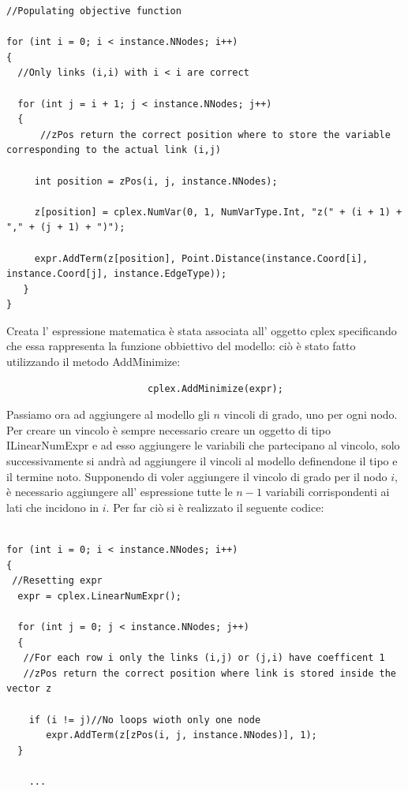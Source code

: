 \documentclass[11pt]{article}
\begin{document}
\begin{lstlisting}
//Populating objective function

for (int i = 0; i < instance.NNodes; i++)
{
  //Only links (i,i) with i < i are correct
  
  for (int j = i + 1; j < instance.NNodes; j++)
  {
      //zPos return the correct position where to store the variable corresponding to the actual link (i,j)
           
     int position = zPos(i, j, instance.NNodes);
           
     z[position] = cplex.NumVar(0, 1, NumVarType.Int, "z(" + (i + 1) + "," + (j + 1) + ")");
         
     expr.AddTerm(z[position], Point.Distance(instance.Coord[i], instance.Coord[j], instance.EdgeType));      
   }
}
\end{lstlisting}
Creata l' espressione matematica \`e stata associata all' oggetto cplex specificando che essa rappresenta la funzione obbiettivo del modello: ci\`o \`e stato fatto utilizzando il metodo AddMinimize:            


\begin{lstlisting}
                         cplex.AddMinimize(expr);         
\end{lstlisting}



Passiamo ora ad aggiungere al modello gli $n$ vincoli di grado, uno per ogni nodo. Per creare un vincolo \`e sempre necessario creare un oggetto di tipo ILinearNumExpr e ad esso aggiungere le variabili che partecipano al vincolo, solo successivamente si andr\`a ad aggiungere il vincoli al modello definendone il tipo e il termine noto. 
Supponendo di voler aggiungere il vincolo di grado per il nodo $i$, \`e  necessario aggiungere all' espressione tutte le $n-1$ variabili corrispondenti ai lati che incidono in $i$. Per far ci\`o si \`e realizzato il seguente codice:
\begin{lstlisting}

for (int i = 0; i < instance.NNodes; i++)
{
 //Resetting expr
  expr = cplex.LinearNumExpr();

  for (int j = 0; j < instance.NNodes; j++)
  {
   //For each row i only the links (i,j) or (j,i) have coefficent 1
   //zPos return the correct position where link is stored inside the vector z
    
    if (i != j)//No loops wioth only one node
       expr.AddTerm(z[zPos(i, j, instance.NNodes)], 1);               
  }

	...

\end{lstlisting}
\end{document}
